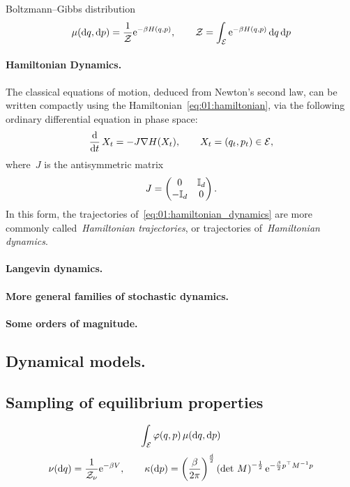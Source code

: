 Boltzmann--Gibbs distribution
\begin{equation}
    \mu(\mathrm{d} q,\mathrm{d} p) = \frac1{\mathcal Z}\mathrm{e}^{-\beta H(q,p)},\qquad \mathcal Z = \int_{\mathcal{E}}\mathrm{e}^{-\beta H(q,p)}\,\mathrm{d} q\,\mathrm{d} p
\end{equation}

\paragraph{Hamiltonian Dynamics.}
The classical equations of motion, deduced from Newton's second law, can be written compactly using the Hamiltonian~\eqref{eq:01:hamiltonian}, via the following ordinary differential equation in phase space:
\begin{equation}
    \label{eq:01:hamiltonian_dynamics}
    \frac{\mathrm{d}}{\mathrm{d} t}\,X_t = -J\nabla H(X_t),\qquad X_t = (q_t,p_t)\in \mathcal{E},
\end{equation}
where~$J$ is the antisymmetric matrix
\begin{equation}
    \label{eq:01:J}
    J=\begin{pmatrix}
        0&\mathbb{I}_{d}\\-\mathbb{I}_{d}&0
    \end{pmatrix}.
\end{equation}
In this form, the trajectories of~\eqref{eq:01:hamiltonian_dynamics} are more commonly called~\textit{Hamiltonian trajectories}, or trajectories of~\textit{Hamiltonian dynamics}.



\paragraph{Langevin dynamics.}

\paragraph{More general families of stochastic dynamics.}

\paragraph{Some orders of magnitude.}

\subsection{Dynamical models.}

\subsection{Sampling of equilibrium properties}
\begin{equation}
    \int_{\mathcal{E}} \varphi(q,p)\,\mu(\mathrm{d} q,\mathrm{d} p)
\end{equation}
\begin{equation}
    \nu(\mathrm{d} q) = \frac1{\mathcal Z_\nu}\mathrm{e}^{-\beta V},\qquad \kappa(\mathrm{d} p) = \left(\frac{\beta}{2\pi}\right)^{\frac{d}{2}}\left(\det\,M\right)^{-\frac12}\mathrm{e}^{-\frac{\beta}{2}p^\top M^{-1}p}
\end{equation}

